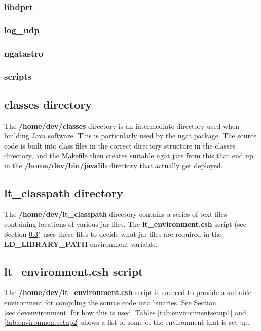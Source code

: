 \documentclass[10pt,a4paper]{article}
\begin{document}
\subsubsection{libdprt}

\subsubsection{log\_udp}

\subsubsection{ngatastro}

\subsubsection{scripts}


\subsection{classes directory}

The {\bf /home/dev/classes} directory is an intermediate directory used when building Java software. This is particularly used by the ngat package. The source code is built into class files in the correct directory structure in the classes directory, and the Makefile then creates suitable ngat jars from this that end up in the {\bf /home/dev/bin/javalib} directory that actually get deployed.

\subsection{lt\_classpath directory}

The {\bf /home/dev/lt\_classpath} directory contains a series of text files containing locations of various jar files.
The {\bf lt\_environment.csh} script (see Section \ref{sec:ltenvironment.csh}) uses these files to decide what jar files are required in the {\bf LD\_LIBRARY\_PATH} environment variable.

\subsection{lt\_environment.csh script}
\label{sec:ltenvironment.csh}

The {\bf /home/dev/lt\_environment.csh} script is sourced to provide a suitable environment for compiling the source code into binaries. See Section \ref{sec:devenvironment} for how this is used. Tables \ref{tab:environmentsetup1} and \ref{tab:environmentsetup2} shows a list of some of the environment that is set up.
\end{document}
